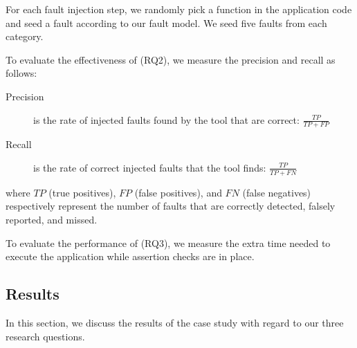 For each fault injection step, we randomly pick a \javascript function in the application code and seed a fault according to our fault model. We seed five faults from each category.
%





To evaluate the effectiveness of \jsart (RQ2), we measure the precision and recall as follows:
\begin{description}
\item[Precision] is the rate of injected faults found by the tool that are correct: $\frac{\mathit{TP}}{\mathit{TP} + \mathit{FP}}$
\item[Recall] is the rate of correct injected faults that the tool finds: $\frac{\mathit{TP}}{\mathit{TP} + \mathit{FN}}$ 
\end{description}
where $TP$ (true positives), $FP$ (false positives), and $FN$ (false negatives) respectively represent the number of faults that are correctly detected, falsely reported, and missed.

To evaluate the performance of \jsart (RQ3), we measure the extra time needed to execute the application while assertion checks are in place. 


\subsection{Results}
In this section, we discuss the results of the case study with regard to our three research questions. 

